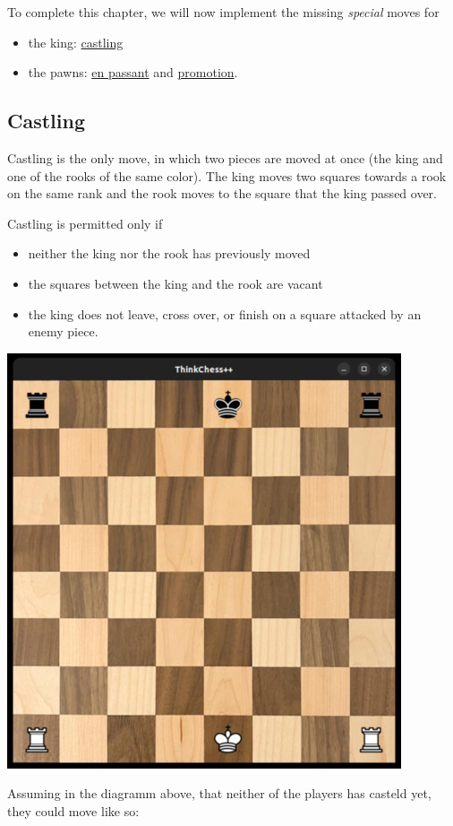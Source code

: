 To complete this chapter, we will now implement the missing \emph{special} moves for
\begin{itemize}
  \item the king: \href{https://en.wikipedia.org/wiki/Castling}{castling}
  \item the pawns: \href{https://en.wikipedia.org/wiki/En_passant}{en passant} and
    \href{https://en.wikipedia.org/wiki/Promotion_(chess)}{promotion}.
\end{itemize}

\subsection{Castling}

Castling is the only move, in which two pieces are moved at once (the king and one
of the rooks of the same color).
The king moves two squares towards a rook on the same rank and the rook moves to the square
that the king passed over.

Castling is permitted only if
\begin{itemize}
  \item neither the king nor the rook has previously moved
  \item the squares between the king and the rook are vacant
  \item the king does not leave, cross over, or finish on a square attacked by an enemy piece.
\end{itemize}

\begin{center}
\includegraphics[width=.5\linewidth]{img/castling1.jpg}
\end{center}

Assuming in the diagramm above, that neither of the players has casteld yet, they could move
like so:

